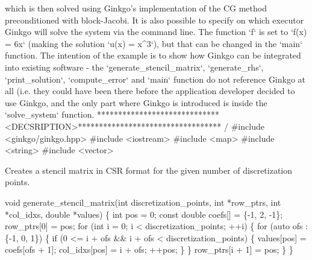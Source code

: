 \begin{DoxyCode}
which is then solved \textcolor{keyword}{using} Ginkgo\textcolor{stringliteral}{'s implementation of the CG method}
\textcolor{stringliteral}{preconditioned with block-Jacobi. It is also possible to specify on which}
\textcolor{stringliteral}{executor Ginkgo will solve the system via the command line.}
\textcolor{stringliteral}{The function `f` is set to `f(x) = 6x` (making the solution `u(x) = x^3`), but}
\textcolor{stringliteral}{that can be changed in the `main` function.}
\textcolor{stringliteral}{}
\textcolor{stringliteral}{The intention of the example is to show how Ginkgo can be integrated into}
\textcolor{stringliteral}{existing software - the `generate\_stencil\_matrix`, `generate\_rhs`,}
\textcolor{stringliteral}{`print\_solution`, `compute\_error` and `main` function do not reference Ginkgo at}
\textcolor{stringliteral}{all (i.e. they could have been there before the application developer decided to}
\textcolor{stringliteral}{use Ginkgo, and the only part where Ginkgo is introduced is inside the}
\textcolor{stringliteral}{`solve\_system` function.}
\textcolor{stringliteral}{*****************************<DECSRIPTION>********************************** /}
\textcolor{stringliteral}{}
\textcolor{stringliteral}{#include <ginkgo/ginkgo.hpp>}
\textcolor{stringliteral}{#include <iostream>}
\textcolor{stringliteral}{#include <map>}
\textcolor{stringliteral}{#include <string>}
\textcolor{stringliteral}{#include <vector>}
\end{DoxyCode}


Creates a stencil matrix in C\+SR format for the given number of discretization points.


\begin{DoxyCode}
\textcolor{keywordtype}{void} generate\_stencil\_matrix(\textcolor{keywordtype}{int} discretization\_points, \textcolor{keywordtype}{int} *row\_ptrs,
                             \textcolor{keywordtype}{int} *col\_idxs, \textcolor{keywordtype}{double} *values)
\{
    \textcolor{keywordtype}{int} pos = 0;
    \textcolor{keyword}{const} \textcolor{keywordtype}{double} coefs[] = \{-1, 2, -1\};
    row\_ptrs[0] = pos;
    \textcolor{keywordflow}{for} (\textcolor{keywordtype}{int} i = 0; i < discretization\_points; ++i) \{
        \textcolor{keywordflow}{for} (\textcolor{keyword}{auto} ofs : \{-1, 0, 1\}) \{
            \textcolor{keywordflow}{if} (0 <= i + ofs && i + ofs < discretization\_points) \{
                values[pos] = coefs[ofs + 1];
                col\_idxs[pos] = i + ofs;
                ++pos;
            \}
        \}
        row\_ptrs[i + 1] = pos;
    \}
\}
\end{DoxyCode}


